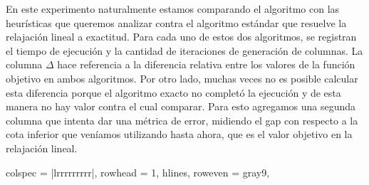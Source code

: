 En este experimento naturalmente estamos comparando el algoritmo con las heurísticas que queremos analizar contra el algoritmo estándar que resuelve la relajación lineal a exactitud. Para cada uno de estos dos algoritmos, se registran el tiempo de ejecución y la cantidad de iteraciones de generación de columnas. La columna $\Delta$ hace referencia a la diferencia relativa entre los valores de la función objetivo en ambos algoritmos. Por otro lado, muchas veces no es posible calcular esta diferencia porque el algoritmo exacto no completó la ejecución y de esta manera no hay valor contra el cual comparar. Para esto agregamos una segunda columna que intenta dar una métrica de error, midiendo el gap con respecto a la cota inferior que veníamos utilizando hasta ahora, que es el valor objetivo en la relajación lineal.

\begin{landscape}


\begin{longtblr}[
  caption = {Comparación entre labeling exacto y aproximado},
]{
  colspec = {|lrrrrrrrrr|},
  rowhead = 1,
  hlines,
  row{even} = {gray9},
} 


\end{longtblr}
\end{landscape}
